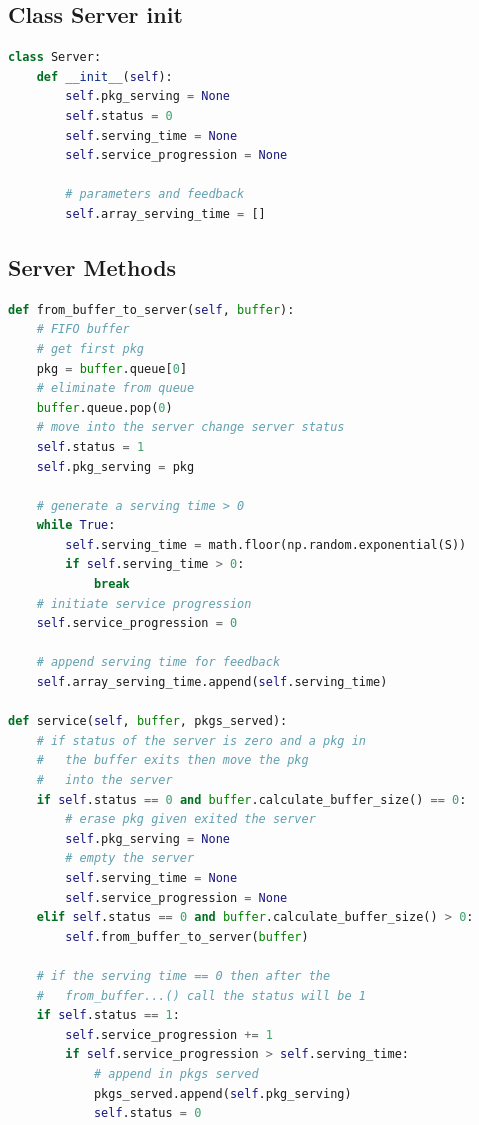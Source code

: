 \documentclass[12pt,a4paper]{article}
\begin{document}
\subsection{Class Server init}
\begin{lstlisting}[language=Python, caption=Class Server init]
class Server:
    def __init__(self):
        self.pkg_serving = None
        self.status = 0
        self.serving_time = None
        self.service_progression = None

        # parameters and feedback
        self.array_serving_time = []
\end{lstlisting}

\newpage
\subsection{Server Methods}
\begin{lstlisting}[language=Python, caption=Server Methods]
def from_buffer_to_server(self, buffer):
    # FIFO buffer
    # get first pkg
    pkg = buffer.queue[0]
    # eliminate from queue
    buffer.queue.pop(0)
    # move into the server change server status
    self.status = 1
    self.pkg_serving = pkg

    # generate a serving time > 0
    while True:
        self.serving_time = math.floor(np.random.exponential(S))
        if self.serving_time > 0:
            break
    # initiate service progression 
    self.service_progression = 0

    # append serving time for feedback 
    self.array_serving_time.append(self.serving_time)

def service(self, buffer, pkgs_served):
    # if status of the server is zero and a pkg in 
    # 	the buffer exits then move the pkg 
    # 	into the server
    if self.status == 0 and buffer.calculate_buffer_size() == 0:
        # erase pkg given exited the server 
        self.pkg_serving = None
        # empty the server 
        self.serving_time = None
        self.service_progression = None
    elif self.status == 0 and buffer.calculate_buffer_size() > 0:
        self.from_buffer_to_server(buffer)

    # if the serving time == 0 then after the 
    # 	from_buffer...() call the status will be 1 
    if self.status == 1:
        self.service_progression += 1
        if self.service_progression > self.serving_time:
            # append in pkgs served
            pkgs_served.append(self.pkg_serving)
            self.status = 0
\end{lstlisting}
\end{document}
